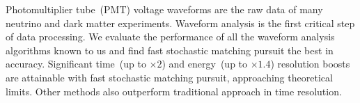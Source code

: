 Photomultiplier tube~(PMT) voltage waveforms are the raw data of many neutrino and dark matter experiments. Waveform analysis is the first critical step of data processing. We evaluate the performance of all the waveform analysis algorithms known to us and find fast stochastic matching pursuit the best in accuracy. Significant time~(up to $\times 2$) and energy~(up to $\times 1.4$) resolution boosts are attainable with fast stochastic matching pursuit, approaching theoretical limits.  Other methods also outperform traditional approach in time resolution.